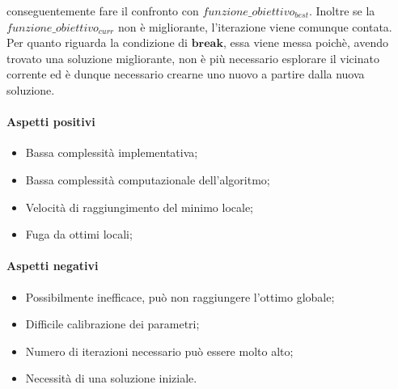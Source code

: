 conseguentemente fare il confronto con {$funzione\_obiettivo_{best}$}. Inoltre se la {$funzione\_obiettivo_{curr}$} non è migliorante, l'iterazione
viene comunque contata.\\
Per quanto riguarda la condizione di {$\textbf{break}$}, essa viene messa poichè, avendo trovato una soluzione migliorante, non è più necessario
esplorare il vicinato corrente ed è dunque necessario crearne uno nuovo a partire dalla nuova soluzione.\\
\vspace*{\fill}
\newpage
\noindent \paragraph{Aspetti positivi}
\begin{itemize}
    \item Bassa complessità implementativa;
    \item Bassa complessità computazionale dell'algoritmo;
    \item Velocità di raggiungimento del minimo locale;
    \item Fuga da ottimi locali;
\end{itemize}

\noindent \paragraph{Aspetti negativi}
\begin{itemize}
    \item Possibilmente inefficace, può non raggiungere l'ottimo globale;
    \item Difficile calibrazione dei parametri;
    \item Numero di iterazioni necessario può essere molto alto;
    \item Necessità di una soluzione iniziale.
\end{itemize}
